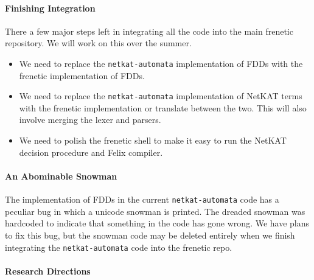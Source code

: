 \documentclass{hw}
\newcommand{\netauto}{\texttt{netkat-automata}}
\begin{document}
\paragraph{Finishing Integration}
There a few major steps left in integrating all the code into the main frenetic
repository. We will work on this over the summer.
\begin{itemize}
  \item
    We need to replace the \netauto{} implementation of FDDs with the frenetic
    implementation of FDDs.
  \item
    We need to replace the \netauto{} implementation of NetKAT terms with the
    frenetic implementation or translate between the two. This will also
    involve merging the lexer and parsers.
  \item
    We need to polish the frenetic shell to make it easy to run the NetKAT
    decision procedure and Felix compiler.
\end{itemize}

\paragraph{An Abominable Snowman}
The implementation of FDDs in the current \netauto{} code has a peculiar bug in
which a unicode snowman is printed. The dreaded snowman was hardcoded to
indicate that something in the code has gone wrong. We have plans to fix this
bug, but the snowman code may be deleted entirely when we finish integrating
the \netauto{} code into the frenetic repo.

\paragraph{Research Directions}
\end{document}
